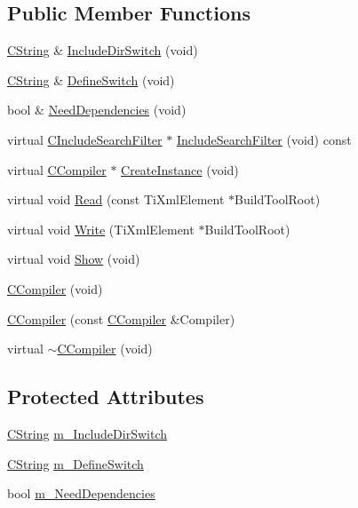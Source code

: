 \subsection*{Public Member Functions}
\begin{DoxyCompactItemize}
\item 
\hyperlink{classCString}{C\-String} \& \hyperlink{classCCompiler_a717ce85599a42b1477a3fce3a34459ba}{Include\-Dir\-Switch} (void)
\item 
\hyperlink{classCString}{C\-String} \& \hyperlink{classCCompiler_a3919ec93f4e95f23c617c3cc377a9201}{Define\-Switch} (void)
\item 
bool \& \hyperlink{classCCompiler_a8c93f10399942769018a0717bba38ea6}{Need\-Dependencies} (void)
\item 
virtual \hyperlink{classCIncludeSearchFilter}{C\-Include\-Search\-Filter} $\ast$ \hyperlink{classCCompiler_a1dc477f47e953ddd4c653f3ba85c5468}{Include\-Search\-Filter} (void) const 
\item 
virtual \hyperlink{classCCompiler}{C\-Compiler} $\ast$ \hyperlink{classCCompiler_a3d4aaaf69e1ba6070c729fd042d90012}{Create\-Instance} (void)
\item 
virtual void \hyperlink{classCCompiler_ac842b165479db817bb86d56367988b10}{Read} (const Ti\-Xml\-Element $\ast$Build\-Tool\-Root)
\item 
virtual void \hyperlink{classCCompiler_a25f64fb47c532b5261c44aca09b34cfa}{Write} (Ti\-Xml\-Element $\ast$Build\-Tool\-Root)
\item 
virtual void \hyperlink{classCCompiler_a07a1bbfb0fc606cf74bccc1ab64a64e8}{Show} (void)
\item 
\hyperlink{classCCompiler_ab6af9b8296df0390fc4b3d21374a0546}{C\-Compiler} (void)
\item 
\hyperlink{classCCompiler_acf3d4756541ce4cf3872de266313dc01}{C\-Compiler} (const \hyperlink{classCCompiler}{C\-Compiler} \&Compiler)
\item 
virtual \hyperlink{classCCompiler_ac305ef10b09c43a81f14389e482f07f8}{$\sim$\-C\-Compiler} (void)
\end{DoxyCompactItemize}
\subsection*{Protected Attributes}
\begin{DoxyCompactItemize}
\item 
\hyperlink{classCString}{C\-String} \hyperlink{classCCompiler_a68e5d39931d7dcaabe9fe019a3838ed4}{m\-\_\-\-Include\-Dir\-Switch}
\item 
\hyperlink{classCString}{C\-String} \hyperlink{classCCompiler_aec5b354b2fa305ca95696cb2fb7d8e79}{m\-\_\-\-Define\-Switch}
\item 
bool \hyperlink{classCCompiler_a8fb628e8ffdab42f6d562229e4e9d2ed}{m\-\_\-\-Need\-Dependencies}
\end{DoxyCompactItemize}
